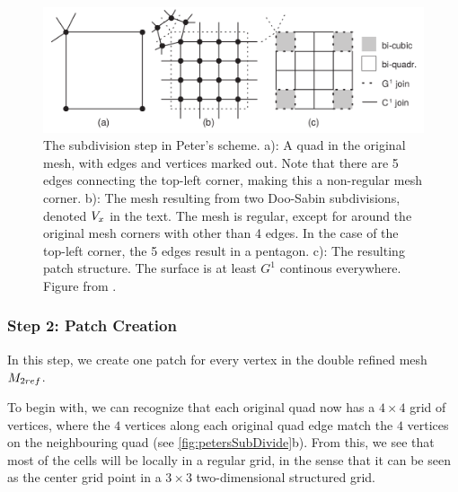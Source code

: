 \begin{figure}
	\centering
	\includegraphics[width = \textwidth]{Pictures/NURBS/petersQuad_to_patches.png}
	\caption{The subdivision step in Peter's scheme. a): A quad in the original mesh, with edges and vertices marked out. Note that there are 5 edges connecting the top-left corner, making this a non-regular mesh corner. b): The mesh resulting from two Doo-Sabin subdivisions, denoted $\petersPatchPoints$ in the text. The mesh is regular, except for around the original mesh corners with other than 4 edges. In the case of the top-left corner, the 5 edges result in a pentagon. c): The resulting \Bez patch structure. The surface is at least $G^1$ continous everywhere. Figure from \cite{eck1996automatic}.}
	\label{fig:petersSubDivide}
\end{figure}

\subsubsection{Step 2: \Bez Patch Creation}
In this step, we create one \Bez patch for every vertex in the double refined mesh $\petersControlMeshDobRef$. 

To begin with, we can recognize that each original quad now has a $4 \times 4$ grid of vertices, where the $4$ vertices along each original quad edge match the $4$ vertices on the neighbouring quad (see \autoref{fig:petersSubDivide}b). From this, we see that most of the cells will be locally in a regular grid, in the sense that it can be seen as the center grid point in a $3\times3$ two-dimensional structured grid.%

